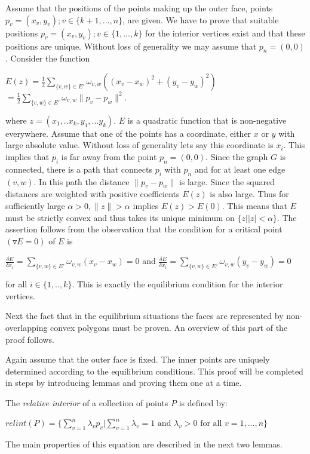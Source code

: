 \documentclass[11pt]{article}
\begin{document}
Assume that the positions of the points making up the outer face, points $p_v = (x_v,y_v); v \in \{k+1,...,n\}$, are given. We have to prove that suitable positions $p_v = (x_v,y_v); v \in \{1,...,k\}$ for the interior vertices exist and that these positions are unique. Without loss of generality we may assume that $p_n = (0,0)$. Consider the function
\begin{center}
$E(z) = \frac{1}{2} \sum\limits_{\{v,w\} \in E'} \omega_{v,w}((x_v - x_w)^2 + (y_v - y_w)^2)$ \\
$= \frac{1}{2} \sum\limits_{\{v,w\} \in E'} \omega_{v,w} \|p_v - p_w\|^2$. \\
\end{center}
where $z = (x_1,..x_k, y_1,...y_k)$.
$E$ is a quadratic function that is non-negative everywhere. Assume that one of the points has a coordinate, either $x$ or $y$ with large absolute value. Without loss of generality lets say this coordinate is $x_i$. This implies that $p_i$ is far away from the point $p_n = (0,0)$. Since the graph $G$ is connected, there is a path that connects $p_i$ with $p_n$ and for at least one edge $(v,w)$. In this path the distance $\|p_v - p_w\|$ is large. Since the squared distances are weighted with positive coefficients $E(z)$ is also large. Thus for sufficiently large $\alpha > 0, \|z\| > \alpha$ implies $E(z) > E(0)$. This means that $E$ must be strictly convex and thus takes its unique minimum on $\{z | |z| < \alpha \}$. The assertion follows from the observation that the condition for a critical point $(\triangledown E = 0)$ of $E$ is
\begin{center}
$\frac{\delta E}{\delta x_i} = \sum\limits_{\{v,w\} \in E'} \omega_{v,w}(x_v - x_w) = 0$ and $\frac{\delta E}{\delta x_i} = \sum\limits_{\{v,w\} \in E'} \omega_{v,w}(y_v - y_w) = 0$
\end{center}
for all $i \in \{1,..,k\}$. This is exactly the equilibrium condition for the interior vertices.

Next the fact that in the equilibrium situations the faces are represented by non-overlapping convex polygons must be proven. An overview of this part of the proof follows. 

Again assume that the outer face is fixed. The inner points are uniquely determined according to the equilibrium conditions. This proof will be completed in steps by introducing lemmas and proving them one at a time.

The \emph{relative interior} of a collection of points $P$ is defined by: 
\begin{center}
$relint(P) = \{\sum_{v=1}^{n} \lambda_vp_v | \sum_{v=1}^{n}\lambda_v =1 \mbox{ and } \lambda_v > 0 \mbox{ for all } v = 1,...,n\}$
\end{center}
The main properties of this equation are described in the next two lemmas. \\
\end{document}

